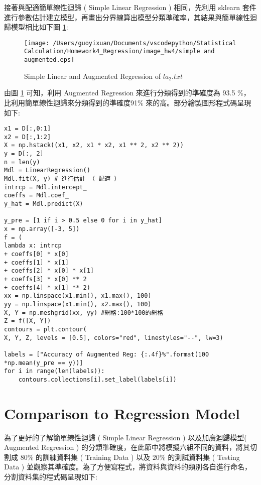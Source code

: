 接著與配適簡單線性迴歸 ( Simple Linear Regression ) 相同，先利用 sklearn 套件進行參數估計建立模型，再畫出分界線算出模型分類準確率，其結果與簡單線性迴歸模型相比如下圖 \ref{fig:simple and augmented regression plot}:

\begin{figure}[H]
    \centering
        \texttt{[image: /Users/guoyixuan/Documents/vscodepython/Statistical Calculation/Homework4\_Regression/image\_hw4/simple and augmented.eps]}
    \caption{Simple Linear and Augmented Regression of $la_2.txt$}
    \label{fig:simple and augmented regression plot}
\end{figure}

由圖 \ref{fig:simple and augmented regression plot} 可知，利用 Augmented Regression 來進行分類得到的準確度為 93.5 $\%$，比利用簡單線性迴歸來分類得到的準確度91$\%$ 來的高。部分繪製圖形程式碼呈現如下:

\bigskip
\begin{lstlisting}
x1 = D[:,0:1]
x2 = D[:,1:2]
X = np.hstack((x1, x2, x1 * x2, x1 ** 2, x2 ** 2))
y = D[:, 2]
n = len(y)
Mdl = LinearRegression()
Mdl.fit(X, y) # 進行估計 （ 配適 ）
intrcp = Mdl.intercept_ 
coeffs = Mdl.coef_ 
y_hat = Mdl.predict(X) 

y_pre = [1 if i > 0.5 else 0 for i in y_hat]
x = np.array([-3, 5])
f = (
lambda x: intrcp
+ coeffs[0] * x[0]
+ coeffs[1] * x[1]
+ coeffs[2] * x[0] * x[1]
+ coeffs[3] * x[0] ** 2
+ coeffs[4] * x[1] ** 2)
xx = np.linspace(x1.min(), x1.max(), 100)
yy = np.linspace(x1.min(), x2.max(), 100)
X, Y = np.meshgrid(xx, yy) #網格:100*100的網格
Z = f([X, Y])
contours = plt.contour(
X, Y, Z, levels = [0.5], colors="red", linestyles="--", lw=3)

labels = ["Accuracy of Augmented Reg: {:.4f}%".format(100 *np.mean(y_pre == y))]
for i in range(len(labels)):
    contours.collections[i].set_label(labels[i])
\end{lstlisting}

\section{Comparison to Regression Model}

為了更好的了解簡單線性迴歸 ( Simple Linear Regression ) 以及加廣迴歸模型( Augmented Regression ) 的分類準確度，在此節中將模擬六組不同的資料，將其切割成 $80\%$ 的訓練資料集 ( Training Data ) 以及 $20\%$ 的測試資料集 ( Testing Data ) 並觀察其準確度。為了方便寫程式，將資料與資料的類別各自進行命名，分割資料集的程式碼呈現如下:

